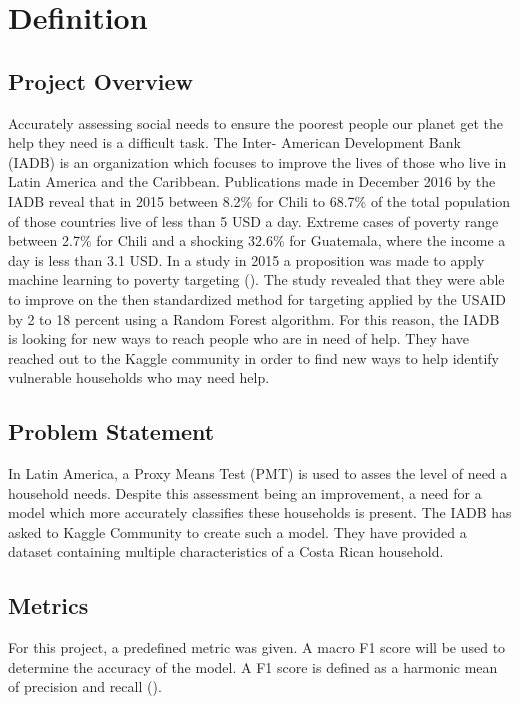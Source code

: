 \documentclass[preprint,12pt]{elsarticle}
\begin{document}
\section{Definition}
\label{S:1}

\subsection{Project Overview}

Accurately assessing social needs to ensure the poorest people our planet get the help they need is a difficult task. The Inter- American Development Bank (IADB) is an organization which focuses to improve the lives of those who live in Latin America and the Caribbean. Publications made in December 2016 by the IADB reveal that in 2015 between 8.2\% for Chili to 68.7\% of the total population of those countries live of less than 5 USD a day. Extreme cases of poverty range between 2.7\% for Chili and a shocking 32.6\% for Guatemala, where the income a day is less than 3.1 USD. In a study in 2015 a proposition was made to apply machine learning to poverty targeting (\citet{McBride:2015}). The study revealed that they were able to improve on the then standardized method for targeting applied by the USAID by 2 to 18 percent using a Random Forest algorithm. For this reason, the IADB is looking for new ways to reach people who are in need of help. They have reached out to the Kaggle community in order to find new ways to help identify vulnerable households who may need help.

\subsection{Problem Statement}

In Latin America, a Proxy Means Test (PMT) is used to asses the level of need a household needs. Despite this assessment being an improvement, a need for a model which more accurately classifies these households is present. The IADB has asked to Kaggle Community to create such a model. They have provided a dataset containing multiple characteristics of a Costa Rican household.

\subsection{Metrics}

For this project, a predefined metric was given. A macro F1 score will be used to determine the accuracy of the model. A F1 score is defined as a harmonic mean of precision and recall (\citet{Yutaka:2007}).\\
\end{document}
